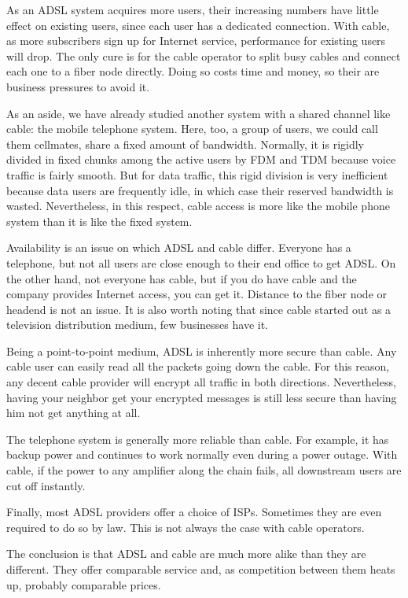 \documentclass[b5paper,11pt]{memoir}
\begin{document}
As an ADSL system acquires more users, their increasing numbers have
little effect on existing users, since each user has a dedicated
connection. With cable, as more subscribers sign up for Internet
service, performance for existing users will drop. The only cure is for
the cable operator to split busy cables and connect each one to a fiber
node directly. Doing so costs time and money, so their are business
pressures to avoid it.

As an aside, we have already studied another system with a shared
channel like cable: the mobile telephone system. Here, too, a group of
users, we could call them cellmates, share a fixed amount of bandwidth.
Normally, it is rigidly divided in fixed chunks among the active users
by FDM and TDM because voice traffic is fairly smooth. But for data
traffic, this rigid division is very inefficient because data users are
frequently idle, in which case their reserved bandwidth is wasted.
Nevertheless, in this respect, cable access is more like the mobile
phone system than it is like the fixed system.

Availability is an issue on which ADSL and cable differ. Everyone has a
telephone, but not all users are close enough to their end office to get
ADSL. On the other hand, not everyone has cable, but if you do have
cable and the company provides Internet access, you can get it. Distance
to the fiber node or headend is not an issue. It is also worth noting
that since cable started out as a television distribution medium, few
businesses have it.

Being a point-to-point medium, ADSL is inherently more secure than
cable. Any cable user can easily read all the packets going down the
cable. For this reason, any decent cable provider will encrypt all
traffic in both directions. Nevertheless, having your neighbor get your
encrypted messages is still less secure than having him not get anything
at all.

The telephone system is generally more reliable than cable. For example,
it has backup power and continues to work normally even during a power
outage. With cable, if the power to any amplifier along the chain fails,
all downstream users are cut off instantly.

Finally, most ADSL providers offer a choice of ISPs. Sometimes they are
even required to do so by law. This is not always the case with cable
operators.

The conclusion is that ADSL and cable are much more alike than they are
different. They offer comparable service and, as competition between
them heats up, probably comparable prices.
\end{document}
